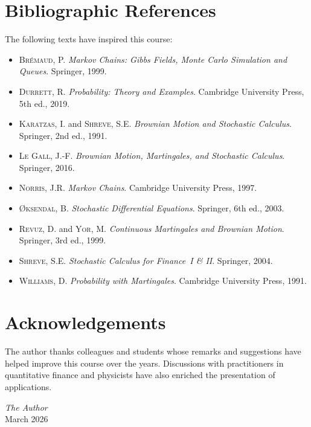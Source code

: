 \section*{Bibliographic References}

The following texts have inspired this course:

\begin{itemize}
  \item \textsc{Br\'emaud}, P. \emph{Markov Chains: Gibbs Fields, Monte Carlo
    Simulation and Queues}. Springer, 1999.
  \item \textsc{Durrett}, R. \emph{Probability: Theory and Examples}. Cambridge
    University Press, 5th ed., 2019.
  \item \textsc{Karatzas}, I. and \textsc{Shreve}, S.E. \emph{Brownian Motion and
    Stochastic Calculus}. Springer, 2nd ed., 1991.
  \item \textsc{Le Gall}, J.-F. \emph{Brownian Motion, Martingales, and Stochastic
    Calculus}. Springer, 2016.
  \item \textsc{Norris}, J.R. \emph{Markov Chains}. Cambridge University Press, 1997.
  \item \textsc{{\O}ksendal}, B. \emph{Stochastic Differential Equations}. Springer,
    6th ed., 2003.
  \item \textsc{Revuz}, D. and \textsc{Yor}, M. \emph{Continuous Martingales and
    Brownian Motion}. Springer, 3rd ed., 1999.
  \item \textsc{Shreve}, S.E. \emph{Stochastic Calculus for Finance~I \& II}.
    Springer, 2004.
  \item \textsc{Williams}, D. \emph{Probability with Martingales}. Cambridge
    University Press, 1991.
\end{itemize}

\section*{Acknowledgements}

The author thanks colleagues and students whose remarks and suggestions have
helped improve this course over the years. Discussions with practitioners in
quantitative finance and physicists have also enriched the presentation of
applications.

\vfill

\begin{flushright}
\textit{The Author}\\
March 2026
\end{flushright}
